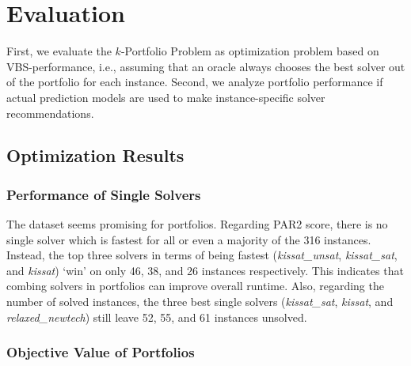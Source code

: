 \documentclass[conference]{IEEEtran}
\begin{document}
\section{Evaluation}
\label{sec:evaluation}

First, we evaluate the $k$-Portfolio Problem as optimization problem based on VBS-performance, i.e., assuming that an oracle always chooses the best solver out of the portfolio for each instance.
Second, we analyze portfolio performance if actual prediction models are used to make instance-specific solver recommendations.

\subsection{Optimization Results}

\subsubsection{Performance of Single Solvers}

The dataset seems promising for portfolios.
Regarding PAR2 score, there is no single solver which is fastest for all or even a majority of the 316 instances.
Instead, the top three solvers in terms of being fastest (\emph{kissat\_unsat}, \emph{kissat\_sat}, and \emph{kissat}) `win' on only 46, 38, and 26 instances respectively.
This indicates that combing solvers in portfolios can improve overall runtime.
Also, regarding the number of solved instances, the three best single solvers (\emph{kissat\_sat}, \emph{kissat}, and \emph{relaxed\_newtech}) still leave 52, 55, and 61 instances unsolved.

\subsubsection{Objective Value of Portfolios}
\end{document}

